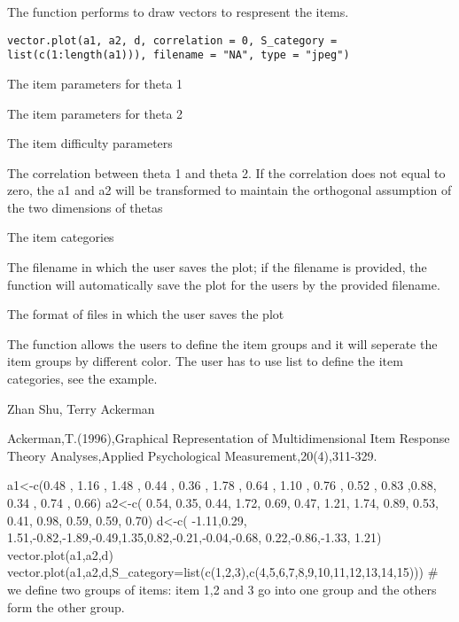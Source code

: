 \begin{Description}\relax
The function performs to draw vectors to respresent the items.
\end{Description}
\begin{Usage}
\begin{verbatim}
vector.plot(a1, a2, d, correlation = 0, S_category = list(c(1:length(a1))), filename = "NA", type = "jpeg")
\end{verbatim}
\end{Usage}
\begin{Arguments}
\begin{ldescription}
\item[\code{a1}] The item parameters for theta 1
\item[\code{a2}] The item parameters for theta 2 
\item[\code{d}] The item difficulty parameters 
\item[\code{correlation}] The correlation between theta 1 and theta 2. If the correlation does not equal to zero, the a1 and a2 will be transformed to maintain the orthogonal assumption of the two dimensions of thetas 
\item[\code{S\_category}] The item categories  
\item[\code{filename}] The filename in which the user saves the plot; if the filename is provided, the function will automatically save the plot for the users by the provided filename.  
\item[\code{type}] The format of files in which the user saves the plot 
\end{ldescription}
\end{Arguments}
\begin{Details}\relax
The function allows the users to define the item groups and it will seperate the item groups by different color. The user has to use list to define the item categories, see the example.
\end{Details}
\begin{Author}\relax
Zhan Shu, Terry Ackerman
\end{Author}
\begin{References}\relax
Ackerman,T.(1996),Graphical Representation of Multidimensional Item Response Theory Analyses,Applied Psychological Measurement,20(4),311-329.
\end{References}
\begin{Examples}
\begin{ExampleCode}
a1<-c(0.48 , 1.16 , 1.48 , 0.44 , 0.36 , 1.78 , 0.64 , 1.10 , 0.76 , 0.52 , 0.83 ,0.88, 0.34 , 0.74 , 0.66)
a2<-c( 0.54, 0.35, 0.44, 1.72, 0.69, 0.47, 1.21, 1.74, 0.89, 0.53, 0.41, 0.98, 0.59, 0.59, 0.70)
d<-c( -1.11,0.29, 1.51,-0.82,-1.89,-0.49,1.35,0.82,-0.21,-0.04,-0.68, 0.22,-0.86,-1.33, 1.21)
vector.plot(a1,a2,d)
vector.plot(a1,a2,d,S_category=list(c(1,2,3),c(4,5,6,7,8,9,10,11,12,13,14,15))) # we define two groups of items: item 1,2 and 3 go into one group and the others form the other group.
\end{ExampleCode}
\end{Examples}

